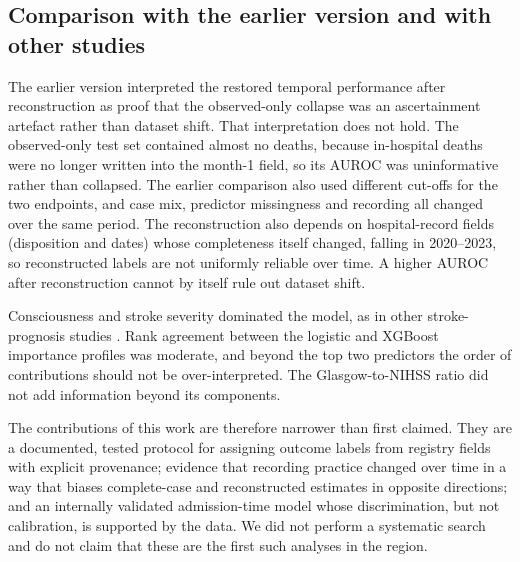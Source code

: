 \documentclass[preprint,10pt]{elsarticle}
\begin{document}
\subsection{Comparison with the earlier version and with other studies}
The earlier version interpreted the restored temporal performance after reconstruction as proof that the observed-only collapse was an ascertainment artefact rather than dataset shift. That interpretation does not hold. The observed-only test set contained almost no deaths, because in-hospital deaths were no longer written into the month-1 field, so its AUROC was uninformative rather than collapsed. The earlier comparison also used different cut-offs for the two endpoints, and case mix, predictor missingness and recording all changed over the same period. The reconstruction also depends on hospital-record fields (disposition and dates) whose completeness itself changed, falling in 2020--2023, so reconstructed labels are not uniformly reliable over time. A higher AUROC after reconstruction cannot by itself rule out dataset shift.

Consciousness and stroke severity dominated the model, as in other stroke-prognosis studies \cite{mansour2014acute,algin2019role,abujaber2024machine}. Rank agreement between the logistic and XGBoost importance profiles was moderate, and beyond the top two predictors the order of contributions should not be over-interpreted. The Glasgow-to-NIHSS ratio did not add information beyond its components.

The contributions of this work are therefore narrower than first claimed. They are a documented, tested protocol for assigning outcome labels from registry fields with explicit provenance; evidence that recording practice changed over time in a way that biases complete-case and reconstructed estimates in opposite directions; and an internally validated admission-time model whose discrimination, but not calibration, is supported by the data. We did not perform a systematic search and do not claim that these are the first such analyses in the region.
\end{document}
